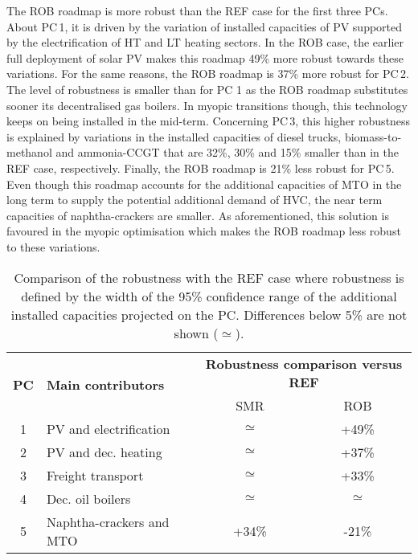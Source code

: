 The ROB roadmap is more robust than the REF case for the first three PCs. About PC\,1, it is driven by the variation of installed capacities of \gls{PV} supported by the electrification of \gls{HT} and \gls{LT} heating sectors. In the ROB case, the earlier full deployment of solar \gls{PV} makes this roadmap 49\% more robust towards these variations. For the same reasons, the ROB roadmap is 37\% more robust for PC\,2. The level of robustness is smaller than for PC 1 as the ROB roadmap substitutes sooner its decentralised gas boilers. In myopic transitions though, this technology keeps on being installed in the mid-term. Concerning PC\,3, this higher robustness is explained by variations in the installed capacities of diesel trucks, biomass-to-methanol and ammonia-\gls{CCGT} that are 32\%, 30\% and 15\% smaller than in the REF case, respectively.  Finally, the ROB roadmap is 21\% less robust for PC\,5. Even though this roadmap accounts for the additional capacities of \gls{MTO} in the long term to supply the potential additional demand of \gls{HVC}, the near term capacities of naphtha-crackers are smaller. As aforementioned, this solution is favoured in the myopic optimisation which makes the ROB roadmap less robust to these variations.

\begin{table}[htbp!]
\caption{Comparison of the robustness with the REF case where robustness is defined by the width of the 95\% confidence range of the additional installed capacities projected on the PC. Differences below 5\% are not shown ($\simeq$).}
\label{tab:projection}
\centering
\begin{tabular}{c l| c c}
\toprule
\multirow{2}{*}{\textbf{PC}} & \multirow{2}{*}{\textbf{Main contributors}} & \multicolumn{2}{c}{\textbf{Robustness comparison versus REF}}\\
& & SMR & ROB \\
\midrule
1 & \gls{PV} and electrification & $\simeq$ & +49\% \\
2 & \gls{PV} and dec. heating & $\simeq$ & +37\%\\
3 & Freight transport & $\simeq$ & +33\%\\
4 & Dec. oil boilers & $\simeq$ & $\simeq$ \\
5 &  Naphtha-crackers and \gls{MTO} & +34\% & -21\%\\
\bottomrule							
\end{tabular}
\end{table}

